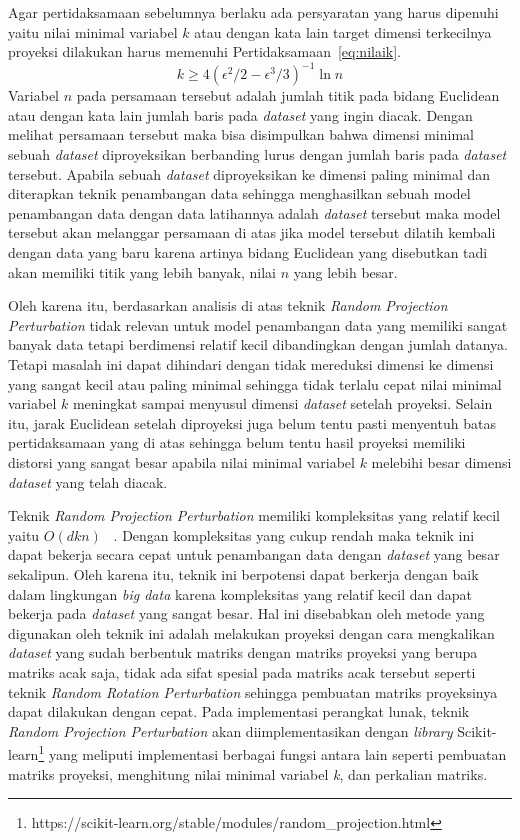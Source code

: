 Agar pertidaksamaan sebelumnya berlaku ada persyaratan yang harus dipenuhi yaitu nilai minimal variabel \(k\) atau dengan kata lain target dimensi terkecilnya proyeksi dilakukan harus memenuhi Pertidaksamaan~\ref{eq:nilaik}.
\begin{equation}\label{eq:nilaik}
	k \geq 4(\epsilon^{2}/2-\epsilon^{3}/3)^{-1}\ln{n}
\end{equation}
Variabel \(n\) pada persamaan tersebut adalah jumlah titik pada bidang Euclidean atau dengan kata lain jumlah baris pada \textit{dataset} yang ingin diacak. Dengan melihat persamaan tersebut maka bisa disimpulkan bahwa dimensi minimal sebuah \textit{dataset} diproyeksikan berbanding lurus dengan jumlah baris pada \textit{dataset} tersebut. Apabila sebuah \textit{dataset} diproyeksikan ke dimensi paling minimal dan diterapkan teknik penambangan data sehingga menghasilkan sebuah model penambangan data dengan data latihannya adalah \textit{dataset} tersebut maka model tersebut akan melanggar persamaan di atas jika model tersebut dilatih kembali dengan data yang baru karena artinya bidang Euclidean yang disebutkan tadi akan memiliki titik yang lebih banyak, nilai \(n\) yang lebih besar. 

Oleh karena itu, berdasarkan analisis di atas teknik \textit{Random Projection Perturbation} tidak relevan untuk model penambangan data yang memiliki sangat banyak data tetapi berdimensi relatif kecil dibandingkan dengan jumlah datanya. Tetapi masalah ini dapat dihindari dengan tidak mereduksi dimensi ke dimensi yang sangat kecil atau paling minimal sehingga tidak terlalu cepat nilai minimal variabel \(k\) meningkat sampai menyusul dimensi \textit{dataset} setelah proyeksi. Selain itu, jarak Euclidean setelah diproyeksi juga belum tentu pasti menyentuh batas pertidaksamaan yang di atas sehingga belum tentu hasil proyeksi memiliki distorsi yang sangat besar apabila nilai minimal variabel \(k\) melebihi besar dimensi \textit{dataset} yang telah diacak.

Teknik \textit{Random Projection Perturbation} memiliki kompleksitas yang relatif kecil yaitu \(O(dkn)\) ~\cite{bingham:01:projection}. Dengan kompleksitas yang cukup rendah maka teknik ini dapat bekerja secara cepat untuk penambangan data dengan \textit{dataset} yang besar sekalipun. Oleh karena itu, teknik ini berpotensi dapat berkerja dengan baik dalam lingkungan \textit{big data} karena kompleksitas yang relatif kecil dan dapat bekerja pada \textit{dataset} yang sangat besar. Hal ini disebabkan oleh metode yang digunakan oleh teknik ini adalah melakukan proyeksi dengan cara mengkalikan \textit{dataset} yang sudah berbentuk matriks dengan matriks proyeksi yang berupa matriks acak saja, tidak ada sifat spesial pada matriks acak tersebut seperti teknik \textit{Random Rotation Perturbation} sehingga pembuatan matriks proyeksinya dapat dilakukan dengan cepat. Pada implementasi perangkat lunak, teknik \textit{Random Projection Perturbation} akan diimplementasikan dengan \textit{library} Scikit-learn\footnote{https://scikit-learn.org/stable/modules/random\_projection.html} yang meliputi implementasi berbagai fungsi antara lain seperti pembuatan matriks proyeksi, menghitung nilai minimal variabel \textit{k}, dan perkalian matriks.

